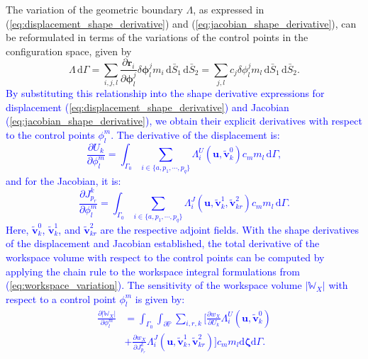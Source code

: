 \documentclass[journal]{IEEEtran}
\theoremstyle{definition}
\begin{document}
The variation of the geometric boundary $\Lambda$, as expressed in  (\ref{eq:displacement_shape_derivative}) and (\ref{eq:jacobian_shape_derivative}), can be reformulated in terms of the variations of the control points in the configuration space, given by
\begin{equation}
  \Lambda \, \mathrm{d}\Gamma = \sum_{i,j,l}\frac{\partial \mathbf{r}_i}{\partial \boldsymbol{\phi}^j_l} \delta \boldsymbol{\phi}^j_l m_i \, \mathrm{d}\bar{S}_1 \, \mathrm{d}\bar{S}_2 = \sum_{j, l} c_j \delta\phi^j_l m_l \, \mathrm{d} \bar{S}_1 \, \mathrm{d} \bar{S}_2.
  \label{eq:shape_derivative_control_points}
\end{equation}
\textcolor{blue}{By substituting this relationship into the shape derivative expressions for displacement (\ref{eq:displacement_shape_derivative}) and Jacobian (\ref{eq:jacobian_shape_derivative}), we obtain their explicit derivatives with respect to the control points $\phi_l^m$. The derivative of the displacement is:
\begin{equation}
    \frac{\partial U_k}{\partial \phi_l^m} = \int_{\Gamma_0} \sum_{i\in\{a,p_1,\cdots,p_q\}} \Lambda_i^U\left(\mathbf{u},\tilde{\mathbf{v}}^0_k\right) c_m  m_l \, \mathrm{d}\Gamma,
    \label{eq:U_derivative}
\end{equation}
and for the Jacobian, it is:
\begin{equation}
    \frac{\partial J^k_{p_r}}{\partial \phi_l^m} = \int_{\Gamma_0} \sum_{i\in\{a,p_1,\cdots,p_q\}} \Lambda_i^J\left(\mathbf{u},\tilde{\mathbf{v}}^1_k,\tilde{\mathbf{v}}^2_{kr}\right) c_m  m_l \, \mathrm{d}\Gamma.
    \label{eq:J_derivative}
\end{equation}
Here, $\tilde{\mathbf{v}}^0_k$, $\tilde{\mathbf{v}}^1_k$, and $\tilde{\mathbf{v}}^2_{kr}$ are the respective adjoint fields. With the shape derivatives of the displacement and Jacobian established, the total derivative of the workspace volume with respect to the control points can be computed by applying the chain rule to the workspace integral formulations from (\ref{eq:workspace_variation}). The sensitivity of the workspace volume $|\mathbb{W}_X|$ with respect to a control point $\phi_l^m$ is given by:
\begin{equation}
\begin{split}
    \frac{\partial |\mathbb{W}_X|}{\partial \phi_l^m} &= \int_{\Gamma_0}  \int_{\partial \mathbb{P}} \sum_{i,r,k} \Biggl[ \frac{\partial w_X}{\partial U_k} \Lambda_i^U\left(\mathbf{u},\tilde{\mathbf{v}}^0_k\right) \\
    &+ \frac{\partial w_X}{\partial J^k_{p_r}} \Lambda_i^J\left(\mathbf{u},\tilde{\mathbf{v}}^1_k,\tilde{\mathbf{v}}^2_{kr}\right) \Biggr] c_m m_l \mathrm{d}\boldsymbol{\zeta}  \mathrm{d}\Gamma.
\end{split}
\label{eq:workspace_derivative_control_points}
\end{equation}}
\end{document}
